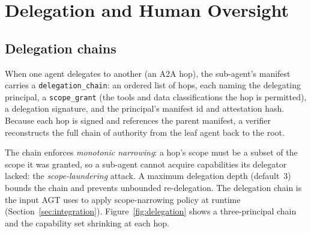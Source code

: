 \section{Delegation and Human Oversight}
\label{sec:deleg}

\subsection{Delegation chains}

When one agent delegates to another (an A2A hop), the sub-agent's manifest carries a
\texttt{delegation\_chain}: an ordered list of hops, each naming the delegating
principal, a \texttt{scope\_grant} (the tools and data classifications the hop is
permitted), a delegation signature, and the principal's manifest id and attestation
hash. Because each hop is signed and references the parent manifest, a verifier
reconstructs the full chain of authority from the leaf agent back to the root.

The chain enforces \emph{monotonic narrowing}: a hop's scope must be a subset of the
scope it was granted, so a sub-agent cannot acquire capabilities its delegator lacked:
the \emph{scope-laundering} attack. A maximum delegation depth (default~3) bounds
the chain and prevents unbounded re-delegation. The delegation chain is the input AGT
uses to apply scope-narrowing policy at runtime (Section~\ref{sec:integration}).
Figure~\ref{fig:delegation} shows a three-principal chain and the capability set
shrinking at each hop.

